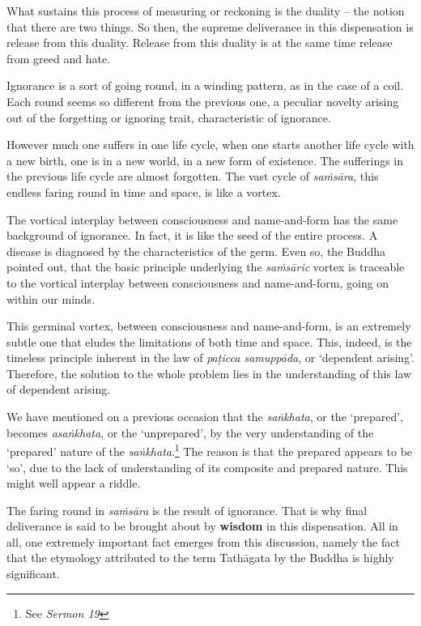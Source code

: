 What sustains this process of measuring or reckoning is the duality -- the notion that there are two things. So then, the supreme deliverance in this dispensation is release from this duality. Release from this duality is at the same time release from greed and hate.

Ignorance is a sort of going round, in a winding pattern, as in the case of a coil. Each round seems so different from the previous one, a peculiar novelty arising out of the forgetting or ignoring trait, characteristic of ignorance.

However much one suffers in one life cycle, when one starts another life cycle with a new birth, one is in a new world, in a new form of existence. The sufferings in the previous life cycle are almost forgotten. The vast cycle of \emph{saṁsāra}, this endless faring round in time and space, is like a vortex.

The vortical interplay between consciousness and name-and-form has the same background of ignorance. In fact, it is like the seed of the entire process. A disease is diagnosed by the characteristics of the germ. Even so, the Buddha pointed out, that the basic principle underlying the \emph{saṁsāric} vortex is traceable to the vortical interplay between consciousness and name-and-form, going on within our minds.

This germinal vortex, between consciousness and name-and-form, is an extremely subtle one that eludes the limitations of both time and space. This, indeed, is the timeless principle inherent in the law of \emph{paṭicca samuppāda}, or `dependent arising'. Therefore, the solution to the whole problem lies in the understanding of this law of dependent arising.

We have mentioned on a previous occasion that the \emph{saṅkhata}, or the `prepared', becomes \emph{asaṅkhata}, or the `unprepared', by the very understanding of the `prepared' nature of the \emph{saṅkhata}.\footnote{See \emph{Sermon 19}} The reason is that the prepared appears to be `so', due to the lack of understanding of its composite and prepared nature. This might well appear a riddle.

The faring round in \emph{saṁsāra} is the result of ignorance. That is why final deliverance is said to be brought about by \textbf{wisdom} in this dispensation. All in all, one extremely important fact emerges from this discussion, namely the fact that the etymology attributed to the term Tathāgata by the Buddha is highly significant.

